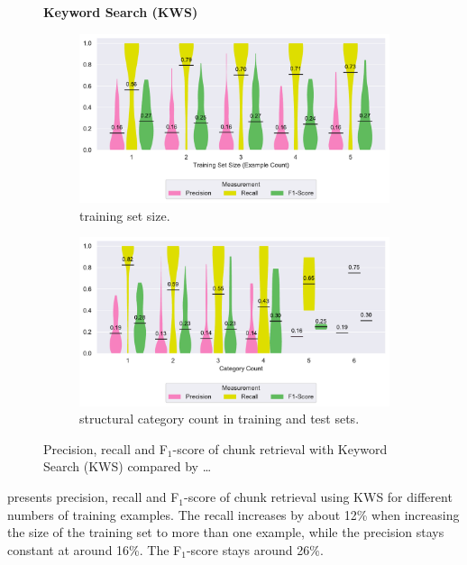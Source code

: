\begin{figure}
\centering
    \textbf{Keyword Search (KWS)}\par\medskip
\begin{subfigure}[b]{\columnwidth}
		\centering
		\includegraphics[width=\columnwidth,
		clip]{img/big-study/recall-precision-examplecount-KWS.pdf}
		\caption{training set size.}
		\label{fig:recall-precision-examplecount-KWS}
\end{subfigure}\hspace{\fill}
\begin{subfigure}[b]{\columnwidth}
		\centering
		\includegraphics[width=\columnwidth,
		clip]{img/big-study/recall-precision-categorycount-KWS.pdf}
		\caption{structural category count
		in training and test sets.}
		\label{fig:recall-precision-categorycount-KWS}
\end{subfigure}
\caption{Precision, recall and F$_{1}$-score of chunk retrieval with
Keyword Search (KWS) compared by \ldots}
\end{figure}


 presents precision,
recall and F$_{1}$-score of chunk retrieval using KWS for different
numbers of training examples.
The recall increases by about 12\% when
increasing the size of the training set to more than one example,
while the precision stays constant at around 16\%.
The F$_{1}$-score
stays around 26\%.

